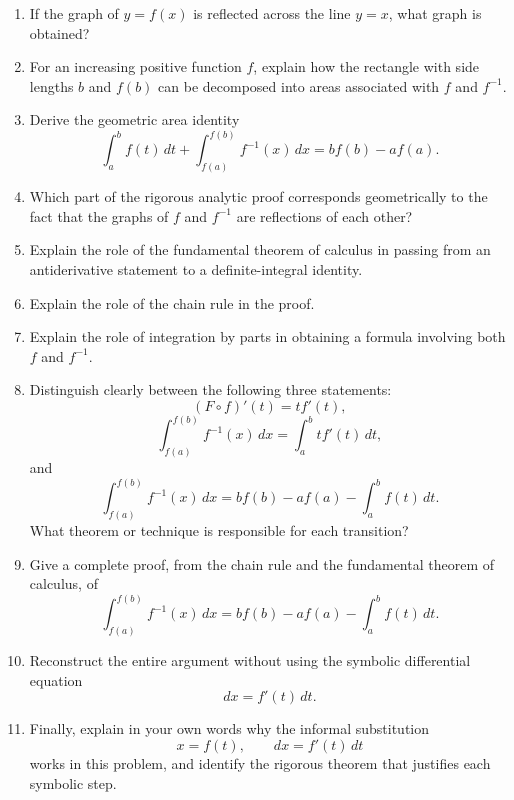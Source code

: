 \begin{enumerate}
  \item If the graph of \(y=f(x)\) is reflected across the line \(y=x\), what graph is obtained?
  \item For an increasing positive function \(f\), explain how the rectangle with side lengths \(b\) and \(f(b)\) can be decomposed into areas associated with \(f\) and \(f^{-1}\).
  \item Derive the geometric area identity
    \[ \int_{a}^{b} f(t)\,dt + \int_{f(a)}^{f(b)}f^{-1}(x)\,dx = b f(b)-a f(a). \]
  \item Which part of the rigorous analytic proof corresponds geometrically to the fact that the graphs of \(f\) and \(f^{-1}\) are reflections of each other?
  \item Explain the role of the fundamental theorem of calculus in passing from an antiderivative statement to a definite-integral identity.
  \item Explain the role of the chain rule in the proof.
  \item Explain the role of integration by parts in obtaining a formula involving both \(f\) and \(f^{-1}\).
  \item Distinguish clearly between the following three statements:
    \[ (F\circ f)'(t)=t f'(t), \]
    \[ \int_{f(a)}^{f(b)}f^{-1}(x)\,dx = \int_{a}^{b} t f'(t)\,dt, \]
    and
    \[ \int_{f(a)}^{f(b)}f^{-1}(x)\,dx = b f(b)-a f(a)-\int_{a}^{b} f(t)\,dt. \]
    What theorem or technique is responsible for each transition?
  \item Give a complete proof, from the chain rule and the fundamental theorem of calculus, of
    \[ \int_{f(a)}^{f(b)}f^{-1}(x)\,dx = b f(b)-a f(a)-\int_{a}^{b} f(t)\,dt. \]
  \item Reconstruct the entire argument without using the symbolic differential equation
    \[ dx=f'(t)\,dt. \]
  \item Finally, explain in your own words why the informal substitution
    \[ x=f(t),\qquad dx=f'(t)\,dt \]
    works in this problem, and identify the rigorous theorem that justifies each symbolic step.
\end{enumerate}
